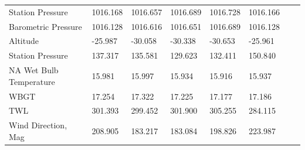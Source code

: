 \documentclass[a4paper,12pt]{article} %
\begin{document}
\begin{enumerate}
\begin{table}[H]
\begin{tabular}{llllllll}
Station Pressure             &1016.168          &1016.657                 &1016.689             &1016.728            & 1016.166 \\
Barometric Pressure             &1016.128          &1016.616                &1016.651             &1016.689            & 1016.128 \\
Altitude             &-25.987          &-30.058                 &-30.338             &-30.653            & -25.961 \\
Station Pressure             &137.317          &135.581                 &129.623             &132.411            & 150.840 \\
NA Wet Bulb Temperature             &15.981          &15.997                 &15.934             &15.916            & 15.937 \\
WBGT             &17.254          &17.322                     &17.225             &17.177            & 17.186 \\
TWL             &301.393        &299.452                     &301.900             &305.255            & 284.115 \\
Wind Direction, Mag                 & 208.905               & 183.217               & 183.084             & 198.826            & 223.987 

\end{tabular}
\label{mean-table}
\end{table}


\end{enumerate}
\end{document}
